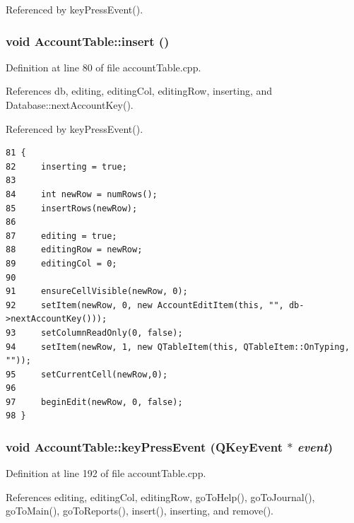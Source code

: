 Referenced by key\-Press\-Event().\hypertarget{classAccountTable_d1}{
\subsubsection[insert]{\setlength{\rightskip}{0pt plus 5cm}void Account\-Table::insert ()}}
\label{classAccountTable_d1}


Definition at line 80 of file account\-Table.cpp.

References db, editing, editing\-Col, editing\-Row, inserting, and Database::next\-Account\-Key().

Referenced by key\-Press\-Event().

\footnotesize\begin{verbatim}81 {
82     inserting = true;
83 
84     int newRow = numRows();
85     insertRows(newRow);
86 
87     editing = true;
88     editingRow = newRow;
89     editingCol = 0;
90 
91     ensureCellVisible(newRow, 0);
92     setItem(newRow, 0, new AccountEditItem(this, "", db->nextAccountKey()));
93     setColumnReadOnly(0, false);
94     setItem(newRow, 1, new QTableItem(this, QTableItem::OnTyping, ""));
95     setCurrentCell(newRow,0);
96 
97     beginEdit(newRow, 0, false);
98 }
\end{verbatim}\normalsize 


\hypertarget{classAccountTable_d0}{
\subsubsection[keyPressEvent]{\setlength{\rightskip}{0pt plus 5cm}void Account\-Table::key\-Press\-Event (QKey\-Event $\ast$ {\em event})}}
\label{classAccountTable_d0}


Definition at line 192 of file account\-Table.cpp.

References editing, editing\-Col, editing\-Row, go\-To\-Help(), go\-To\-Journal(), go\-To\-Main(), go\-To\-Reports(), insert(), inserting, and remove().

